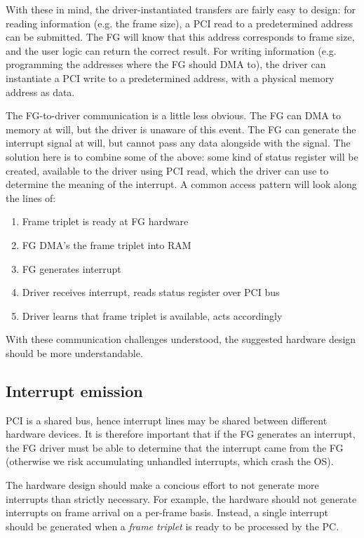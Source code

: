 \documentclass[12pt]{article}
\begin{document}
With these in mind, the driver-instantiated transfers are fairly easy to design: for reading information (e.g. the frame size), a PCI read to a predetermined address can be submitted. The FG will know that this address corresponds to frame size, and the user logic can return the correct result. For writing information (e.g. programming the addresses where the FG should DMA to), the driver can instantiate a PCI write to a predetermined address, with a physical memory address as data.

The FG-to-driver communication is a little less obvious. The FG can DMA to memory at will, but the driver is unaware of this event. The FG can generate the interrupt signal at will, but cannot pass any data alongside with the signal. The solution here is to combine some of the above: some kind of status register will be created, available to the driver using PCI read, which the driver can use to determine the meaning of the interrupt. A common access pattern will look along the lines of:

\begin{enumerate}
\item Frame triplet is ready at FG hardware
\item FG DMA's the frame triplet into RAM
\item FG generates interrupt
\item Driver receives interrupt, reads status register over PCI bus
\item Driver learns that frame triplet is available, acts accordingly
\end{enumerate}

With these communication challenges understood, the suggested hardware design should be more understandable.

\subsection{Interrupt emission}

PCI is a shared bus, hence interrupt lines may be shared between different hardware devices. It is therefore important that if the FG generates an interrupt, the FG driver must be able to determine that the interrupt came from the FG (otherwise we risk accumulating unhandled interrupts, which crash the OS).

The hardware design should make a concious effort to not generate more interrupts than strictly necessary. For example, the hardware should not generate interrupts on frame arrival on a per-frame basis. Instead, a single interrupt should be generated when a \textit{frame triplet} is ready to be processed by the PC.
\end{document}
